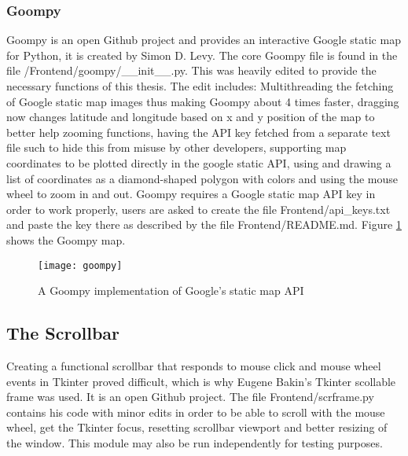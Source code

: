 \subsubsection{Goompy}
Goompy\cite{goompy} is an open Github project and provides an interactive Google static map\cite{googleSM} for Python, it is created by Simon D. Levy.
The core Goompy file is found in the file /Frontend/goompy/\_\_init\_\_.py. This was heavily edited to provide the necessary functions of this thesis. The edit includes: Multithreading the fetching of Google static map images thus making Goompy about 4 times faster, dragging now changes latitude and longitude based on x and y position of the map to better help zooming functions, having the API key fetched from a separate text file such to hide this from misuse by other developers, supporting map coordinates to be plotted directly in the google static API, using and drawing a list of coordinates as a diamond-shaped polygon with colors and using the mouse wheel to zoom in and out. Goompy requires a Google static map API key in order to work properly, users are asked to create the file Frontend/api\_keys.txt and paste the key there as described by the file Frontend/README.md.
Figure \ref{fig:the_goompy} shows the Goompy map.

\begin{figure}[ht]
\texttt{[image: goompy]}
\centering
\caption{A Goompy implementation of Google's static map API}
\label{fig:the_goompy}
\end{figure}




\subsection{The Scrollbar}
Creating a functional scrollbar that responds to mouse click and mouse wheel events in Tkinter proved difficult, which is why Eugene Bakin's Tkinter scollable\cite{scrframe} frame was used. It is an open Github project. The file Frontend/scrframe.py contains his code with minor edits in order to be able to scroll with the mouse wheel, get the Tkinter focus, resetting scrollbar viewport and better resizing of the window. This module may also be run independently for testing purposes.




